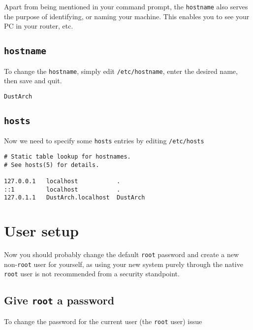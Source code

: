 \documentclass[9pt]{report}
\begin{document}
Apart from being mentioned in your command prompt, the \texttt{hostname} also serves the purpose of identifying, or naming your machine.
This enables you to see your PC in your router, etc.



\newpage

\hypertarget{x-hostname}{\subsection{\texttt{hostname}}}
To change the \texttt{hostname}, simply edit \texttt{/etc/hostname}, enter the desired name, then save and quit.


\begin{verbatim}
DustArch
\end{verbatim}


\newpage

\hypertarget{x-hosts}{\subsection{\texttt{hosts}}}
Now we need to specify some \texttt{hosts} entries by editing \texttt{/etc/hosts}


\begin{verbatim}
# Static table lookup for hostnames.
# See hosts(5) for details.

127.0.0.1   localhost           .
::1         localhost           .
127.0.1.1   DustArch.localhost  DustArch
\end{verbatim}


\newpage

\hypertarget{x-user-setup}{\section{User setup}}
Now you should probably change the default \texttt{root} password and create a new non-\texttt{root} user for yourself, as using your new system purely through the native \texttt{root} user is not recommended from a security standpoint.



\newpage

\hypertarget{x-give-root-a-password}{\subsection{Give \texttt{root} a password}}
To change the password for the current user (the \texttt{root} user) issue
\end{document}
